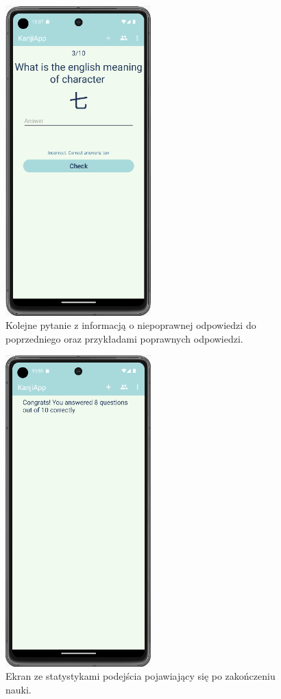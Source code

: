 \documentclass[a4paper,twoside,12pt]{book}
\begin{document}
\begin{figure}[]
\centering
\includegraphics[width=0.5\textwidth]{learn/incorrect}
\caption{Kolejne pytanie z informacją o niepoprawnej odpowiedzi do poprzedniego oraz przykładami poprawnych odpowiedzi.}
\label{fig:incorrect}
\end{figure}

\begin{figure}[]
\centering
\includegraphics[width=0.5\textwidth]{learn/stats}
\caption{Ekran ze statystykami podejścia pojawiający się po zakończeniu nauki.}
\label{fig:stats}
\end{figure}
\end{document}

